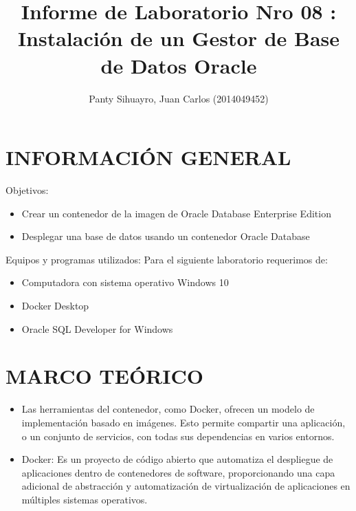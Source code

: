 \documentclass[preprint,12pt]{elsarticle}
\begin{document}
	\begin{frontmatter}
		\title{\huge Informe de Laboratorio Nro 08 : Instalación de un Gestor de Base de Datos Oracle}
		\address{Universidad Privada de Tacna}
		\address{Escuela Profesional de Ingeniería de Sistemas}
		\address{Curso : Base de Datos II}		
		\author{Panty Sihuayro, Juan Carlos             	(2014049452)}		
		\address{Tacna, Perú}
\end{frontmatter}

\section{INFORMACIÓN GENERAL}
Objetivos:
\begin{itemize}
\item Crear un contenedor de la imagen de Oracle Database Enterprise Edition 
\item Desplegar una base de datos usando un contenedor Oracle Database
\end{itemize}
Equipos y programas utilizados:
Para el siguiente laboratorio requerimos de:
\begin{itemize}
\item Computadora con sistema operativo Windows 10
\item Docker Desktop
\item Oracle SQL Developer for Windows

\end{itemize}

\section{MARCO TEÓRICO}
\begin{itemize}
\item Las herramientas del contenedor, como Docker, ofrecen un modelo de implementación basado en imágenes. Esto permite compartir una aplicación, o un conjunto de servicios, con todas sus dependencias en varios entornos.
\item Docker: Es un proyecto de código abierto que automatiza el despliegue de aplicaciones dentro de contenedores de software, proporcionando una capa adicional de abstracción y automatización de virtualización de aplicaciones en múltiples sistemas operativos.
\end{itemize}
\end{document}
